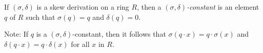 \documentclass[12pt]{article}
\begin{document}
If $(\sigma, \delta)$ is a skew derivation on a ring $R$,
then a {\it $(\sigma, \delta)$-constant} is an element $q$ of $R$
such that $\sigma(q)=q$ and $\delta(q)=0$.
\par
Note: If $q$ is a $(\sigma, \delta)$-constant,
then it follows that $\sigma(q \cdot x)=q \cdot \sigma(x)$
and $\delta(q \cdot x)=q \cdot \delta(x)$ for all $x$ in $R$.
\end{document}
